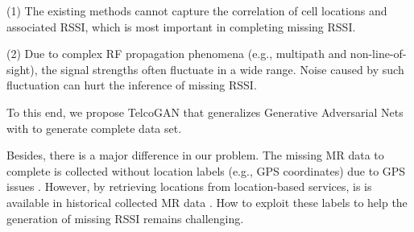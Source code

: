 (1) The existing methods cannot capture the correlation of cell locations and associated RSSI, which is most important in completing missing RSSI.

(2) Due to complex RF propagation phenomena (e.g., multipath and non-line-of-sight), the signal strengths often fluctuate in a wide range. Noise caused by such fluctuation can hurt the inference of missing RSSI.

To this end, we propose TelcoGAN that generalizes Generative Adversarial Nets \cite{DBLP:conf/nips/GoodfellowPMXWOCB14} with  to generate complete data set.

Besides, there is a major difference in our problem. The missing MR data to complete is collected without location labels (e.g., GPS coordinates) due to GPS issues \cite{DBLP:conf/mdm/ZhangRYZY17}. However, by retrieving locations from location-based services, is is available in historical collected MR data \cite{DBLP:journals/imwut/HuangLWCXZ17}. How to exploit these labels to help the generation of missing RSSI remains challenging. 